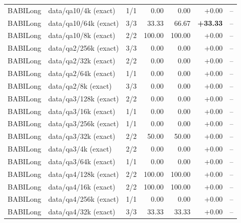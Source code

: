\begin{longtable}{lp{3.1cm}rrrrr}
BABILong & \raggedright data/\allowbreak qa10/\allowbreak 4k {\tiny (exact)} & 1/1 & 0.00 & 0.00 & +0.00 & -- \\
BABILong & \raggedright data/\allowbreak qa10/\allowbreak 64k {\tiny (exact)} & 3/3 & 33.33 & 66.67 & \textbf{+33.33} & -- \\
BABILong & \raggedright data/\allowbreak qa10/\allowbreak 8k {\tiny (exact)} & 2/2 & 100.00 & 100.00 & +0.00 & -- \\
BABILong & \raggedright data/\allowbreak qa2/\allowbreak 256k {\tiny (exact)} & 3/3 & 0.00 & 0.00 & +0.00 & -- \\
BABILong & \raggedright data/\allowbreak qa2/\allowbreak 32k {\tiny (exact)} & 2/2 & 0.00 & 0.00 & +0.00 & -- \\
BABILong & \raggedright data/\allowbreak qa2/\allowbreak 64k {\tiny (exact)} & 1/1 & 0.00 & 0.00 & +0.00 & -- \\
BABILong & \raggedright data/\allowbreak qa2/\allowbreak 8k {\tiny (exact)} & 3/3 & 0.00 & 0.00 & +0.00 & -- \\
BABILong & \raggedright data/\allowbreak qa3/\allowbreak 128k {\tiny (exact)} & 2/2 & 0.00 & 0.00 & +0.00 & -- \\
BABILong & \raggedright data/\allowbreak qa3/\allowbreak 16k {\tiny (exact)} & 1/1 & 0.00 & 0.00 & +0.00 & -- \\
BABILong & \raggedright data/\allowbreak qa3/\allowbreak 256k {\tiny (exact)} & 1/1 & 0.00 & 0.00 & +0.00 & -- \\
BABILong & \raggedright data/\allowbreak qa3/\allowbreak 32k {\tiny (exact)} & 2/2 & 50.00 & 50.00 & +0.00 & -- \\
BABILong & \raggedright data/\allowbreak qa3/\allowbreak 4k {\tiny (exact)} & 2/2 & 0.00 & 0.00 & +0.00 & -- \\
BABILong & \raggedright data/\allowbreak qa3/\allowbreak 64k {\tiny (exact)} & 1/1 & 0.00 & 0.00 & +0.00 & -- \\
BABILong & \raggedright data/\allowbreak qa4/\allowbreak 128k {\tiny (exact)} & 2/2 & 100.00 & 100.00 & +0.00 & -- \\
BABILong & \raggedright data/\allowbreak qa4/\allowbreak 16k {\tiny (exact)} & 2/2 & 100.00 & 100.00 & +0.00 & -- \\
BABILong & \raggedright data/\allowbreak qa4/\allowbreak 256k {\tiny (exact)} & 1/1 & 0.00 & 0.00 & +0.00 & -- \\
BABILong & \raggedright data/\allowbreak qa4/\allowbreak 32k {\tiny (exact)} & 3/3 & 33.33 & 33.33 & +0.00 & -- \\

\end{longtable}
